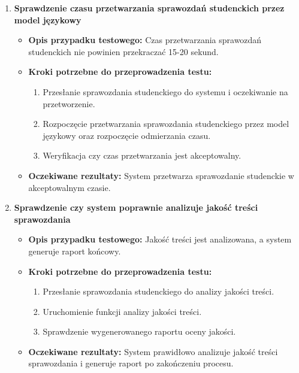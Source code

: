 \documentclass[a4paper, 12pt]{article}
\begin{document}
\begin{enumerate}
\item \textbf{Sprawdzenie czasu przetwarzania sprawozdań studenckich przez model językowy}
   \begin{itemize}
   \item \textbf{Opis przypadku testowego:} Czas przetwarzania sprawozdań studenckich nie powinien przekraczać 15-20 sekund.
   \item \textbf{Kroki potrzebne do przeprowadzenia testu:}
     \begin{enumerate}
     \item Przesłanie sprawozdania studenckiego do systemu i oczekiwanie na przetworzenie.
     \item Rozpoczęcie przetwarzania sprawozdania studenckiego przez model językowy oraz rozpoczęcie odmierzania czasu.
     \item Weryfikacja czy czas przetwarzania jest akceptowalny.
     \end{enumerate}
   \item \textbf{Oczekiwane rezultaty:} System przetwarza sprawozdanie studenckie w akceptowalnym czasie.
   \end{itemize}

\item \textbf{Sprawdzenie czy system poprawnie analizuje jakość treści sprawozdania}
   \begin{itemize}
   \item \textbf{Opis przypadku testowego:} Jakość treści jest analizowana, a system generuje raport końcowy.
   \item \textbf{Kroki potrzebne do przeprowadzenia testu:}
     \begin{enumerate}
     \item Przesłanie sprawozdania studenckiego do analizy jakości treści.
     \item Uruchomienie funkcji analizy jakości treści.
     \item Sprawdzenie wygenerowanego raportu oceny jakości.
     \end{enumerate}
   \item \textbf{Oczekiwane rezultaty:} System prawidłowo analizuje jakość treści sprawozdania i generuje raport po zakończeniu procesu.
   \end{itemize}


\end{enumerate}
\end{document}
